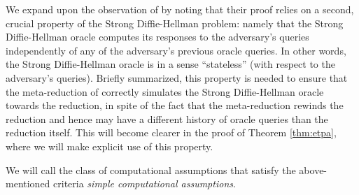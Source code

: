 We expand upon the observation of 
by noting that their proof relies on a second, crucial property of the Strong Diffie-Hellman problem:
namely that the Strong Diffie-Hellman oracle computes its
responses to the adversary's queries
independently of any of the adversary's previous oracle queries.
In other words, the Strong Diffie-Hellman oracle is in a sense ``stateless''
(with respect to the adversary's queries).
Briefly summarized,
this property is needed to ensure that
the meta-reduction of 
correctly simulates the Strong Diffie-Hellman oracle
towards the reduction, in spite of the fact
that the meta-reduction rewinds the reduction
and hence may have a different history of oracle queries
than the reduction itself.
This will become clearer in the proof of Theorem \ref{thm:etpa},
where we will make explicit use of this property.

We will call the class of computational assumptions
that satisfy the above-mentioned criteria
\emph{simple computational assumptions}.


